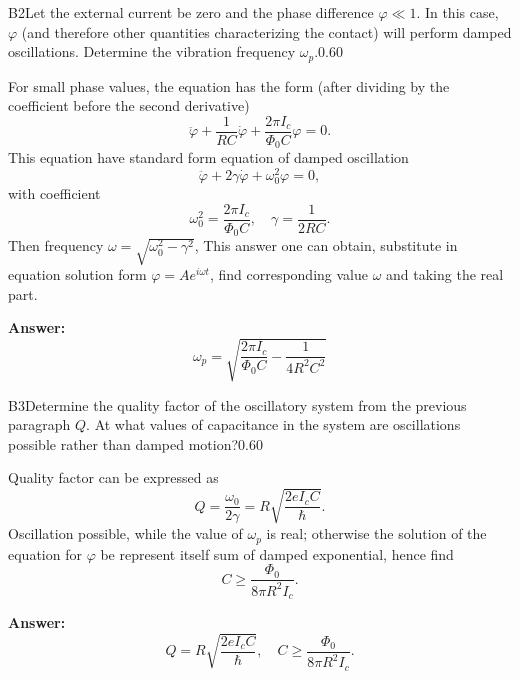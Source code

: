 \documentclass[11pt,a4paper]{article}
\begin{document}
\begin{solcard}{B2}{Let the external current be zero and the phase difference $\varphi \ll 1$. In this case, $\varphi$ (and therefore other quantities characterizing the contact) will perform damped oscillations. Determine the vibration frequency $\omega_p$.}{0.60}

For small phase values, the equation has the form (after dividing by the coefficient before the second derivative) $$ \ddot{\varphi} + \frac{1}{RC} \dot{\varphi} + \frac{2 \pi I_c }{\Phi_0 C}\varphi = 0. $$This equation have standard form equation of damped oscillation $$ \ddot{\varphi} + 2 \gamma \dot{\varphi}  + \omega_0^2 \varphi = 0, $$with coefficient $$ \omega_0^2 =  \frac{2 \pi I_c }{\Phi_0 C}, \quad \gamma = \frac{1}{2 RC}. $$Then frequency $\omega = \sqrt{\omega_0^2 - \gamma^2}$, This answer one can obtain, substitute in equation solution form $\varphi = A e^{i \omega t}$, find corresponding value $\omega$ and taking the real part.

\par\smallskip\noindent\textbf{Answer:} $$ \omega_p = \sqrt{ \frac{2 \pi I_c }{\Phi_0 C}- \frac{1}{4 R^2 C^2}} $$
\end{solcard}

\begin{solcard}{B3}{Determine the quality factor of the oscillatory system from the previous paragraph $Q$. At what values of capacitance in the system are oscillations possible rather than damped motion?}{0.60}

Quality factor can be expressed as $$ Q = \frac{\omega_0}{2 \gamma} = R \sqrt{\frac{2 eI_c C}{\hbar}}. $$Oscillation possible, while the value of $\omega_p$ is real; otherwise the solution of the equation for $\varphi$ be represent itself sum of damped exponential, hence find $$ C \ge \frac{\Phi_0}{8 \pi R^2 I_c}. $$

\par\smallskip\noindent\textbf{Answer:} $$ Q = R \sqrt{\frac{2 eI_c C}{\hbar}}, \quad C \ge \frac{\Phi_0}{8 \pi R^2 I_c}. $$
\end{solcard}
\end{document}

